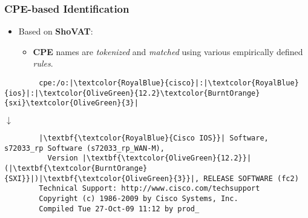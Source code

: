 \documentclass[aspectratio=169,xcolor={usenames,dvipsnames}]{beamer}
\begin{document}
\begin{frame}[fragile]
	\frametitle{CPE-based Identification}
	
	\begin{itemize}
		\item Based on \textbf{ShoVAT}:
		\begin{itemize}
			\item \textbf{CPE} names are \textit{tokenized} and \textit{matched} using various empirically defined \textit{rules}.
		\end{itemize}
	\end{itemize}
	
	\vspace{5pt}
	
	\begin{center}
	\begin{minipage}{.8\textwidth}
	\begin{verbatim}
		cpe:/o:|\textcolor{RoyalBlue}{cisco}|:|\textcolor{RoyalBlue}{ios}|:|\textcolor{OliveGreen}{12.2}\textcolor{BurntOrange}{sxi}\textcolor{OliveGreen}{3}|
	\end{verbatim}
	
	\vspace{-7pt}
	\begin{center}
		$\downarrow$
	\end{center}
	\vspace{-7pt}
	
	\begin{verbatim}
		|\textbf{\textcolor{RoyalBlue}{Cisco IOS}}| Software, s72033_rp Software (s72033_rp_WAN-M),
		  Version |\textbf{\textcolor{OliveGreen}{12.2}}|(|\textbf{\textcolor{BurntOrange}{SXI}}|)|\textbf{\textcolor{OliveGreen}{3}}|, RELEASE SOFTWARE (fc2)
		Technical Support: http://www.cisco.com/techsupport
		Copyright (c) 1986-2009 by Cisco Systems, Inc.
		Compiled Tue 27-Oct-09 11:12 by prod_ 
	\end{verbatim}
	\end{minipage}
	\end{center}
\end{frame}
\end{document}
